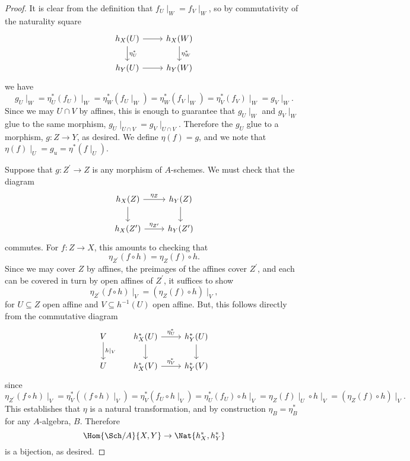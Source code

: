 \documentclass[10pt]{amsart}
\begin{document}
\begin{prop}
\begin{proof}
    It is clear from the definition that $f_U\mid_W  = f_V\mid_W$, so by commutativity of the naturality square
    $$\begin{tikzcd}
      h_X(U)\arrow{d}{\eta^*_U}\arrow{r} & h_X(W)\arrow{d}{\eta_W^*}\\
      h_Y(U)\arrow{r} & h_Y(W)
    \end{tikzcd}$$
    we have
    $$g_U\mid_W = \eta^*_U(f_U)\mid_W = \eta^*_W(f_U\mid_W) = \eta^*_W(f_V\mid_W) = \eta^*_V(f_V)\mid_W = g_V\mid_W.$$
    Since we may $U \cap V$ by affines, this is enough to guarantee that $g_U\mid_W$ and $g_V\mid_W$ glue to the same morphism, $g_U\mid_{U \cap V} = g_V\mid_{U \cap V}$.
    Therefore the $g_U$ glue to a morphism, $g : Z \rightarrow Y$, as desired.
    We define $\eta(f) = g$, and we note that $\eta(f)\mid_U = g_u = \eta^*(f\mid_U)$.

    Suppose that $g : Z^\prime \rightarrow Z$ is any morphism of $A$-schemes.
    We must check that the diagram
    $$\begin{tikzcd}
      h_X(Z) \arrow{r}{\eta_Z}\arrow{d} & h_Y(Z)\arrow{d}\\
      h_X(Z^\prime)\arrow{r}{\eta_{Z^\prime}} & h_Y(Z^\prime)
    \end{tikzcd}$$
    commutes.
    For $f : Z \rightarrow X$, this amounts to checking that
    $$\eta_{Z^\prime}(f \circ h) = \eta_Z(f) \circ h.$$
    Since we may cover $Z$ by affines, the preimages of the affines cover $Z^\prime$, and each can be covered in turn by open affines of $Z^\prime$, it suffices to show
    $$\eta_{Z^\prime}(f \circ h)\mid_V = \left(\eta_Z(f) \circ h\right) \mid_V,$$
    for $U \subseteq Z$ open affine and $V \subseteq h^{-1}(U)$ open affine.
    But, this follows directly from the commutative diagram
    $$\begin{tikzcd}
      V\arrow{d}{h\mid_V} & h_X^*(U)\arrow{r}{\eta_U^*}\arrow{d} & h_Y^*(U)\arrow{d}\\
      U & h_X^*(V)\arrow{r}{\eta_V^*} & h_Y^*(V)
    \end{tikzcd}$$
    since
    $$\eta_{Z^\prime}(f \circ h)\mid_V = \eta_V^*\left(\left(f \circ h\right) \mid_V\right) = \eta_V^*(f_U \circ h\mid_V) = \eta_U^*(f_U) \circ h\mid_V = \eta_Z(f)\mid_U \circ h\mid_V = \left(\eta_Z(f) \circ h\right) \mid_V.$$
    This establishes that $\eta$ is a natural transformation, and by construction $\eta_B = \eta^*_B$ for any $A$-algebra, $B$.
    Therefore
    $$\Hom{\Sch/A}{X,Y} \rightarrow \Nat{h_X^*, h_Y^*}$$
    is a bijection, as desired.
  \end{proof}
\end{prop}
\end{document}
